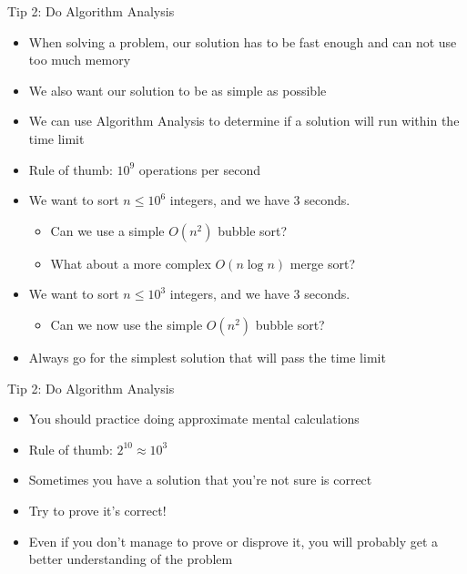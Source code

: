 \documentclass[12pt,t]{beamer}
\newcommand{\bi}{\begin{itemize}}
\newcommand{\ei}{\end{itemize}}
\begin{document}
\begin{frame}{Tip 2: Do Algorithm Analysis}
    \bi
        \item When solving a problem, our solution has to be fast enough and can not use too much memory
        \item We also want our solution to be as simple as possible
        \vspace{5pt}
        \item We can use Algorithm Analysis to determine if a solution will run within the time limit
        \item Rule of thumb: $10^{9}$ operations per second
        \vspace{10pt}
        \item We want to sort $n \leq 10^{6}$ integers, and we have 3 seconds.
            \bi
                \item Can we use a simple $O(n^2)$ bubble sort?
                \item What about a more complex $O(n\log n)$ merge sort?
            \ei
        \vspace{5pt}
        \item We want to sort $n \leq 10^{3}$ integers, and we have 3 seconds.
            \bi
                \item Can we now use the simple $O(n^2)$ bubble sort?
            \ei
        \vspace{5pt}
        \item Always go for the simplest solution that will pass the time limit
    \ei
\end{frame}

\begin{frame}{Tip 2: Do Algorithm Analysis}
    \bi
        \item You should practice doing approximate mental calculations
        \item Rule of thumb: $2^{10} \approx 10^{3}$
        \vspace{10pt}
        \item Sometimes you have a solution that you're not sure is correct
        \item Try to prove it's correct!
        \item Even if you don't manage to prove or disprove it, you will probably get a better understanding of the problem
        \vspace{20pt}
    \ei
\end{frame}
\end{document}
